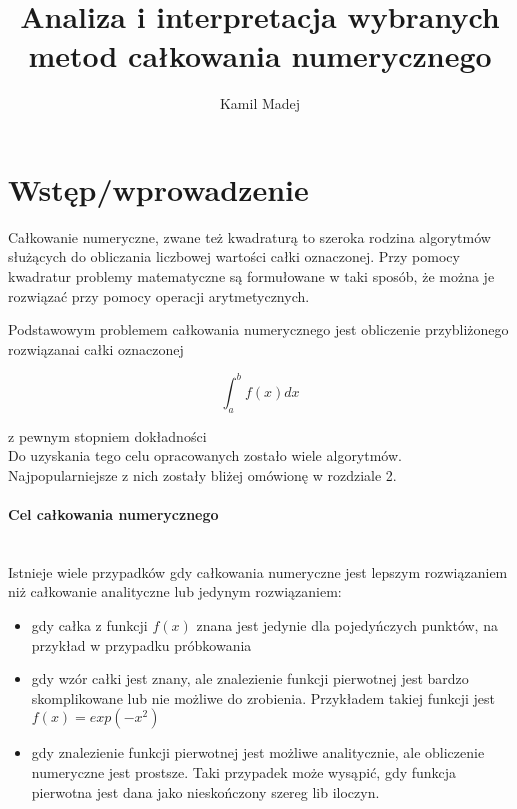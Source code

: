 \documentclass[12pt,twoside]{article}
\author{Kamil Madej}
\title{Analiza i interpretacja wybranych metod całkowania numerycznego}
\begin{document}
\maketitle

\blankpage

\tableofcontents

\clearpage
\blankpage


\section{Wstęp/wprowadzenie}

Całkowanie numeryczne, zwane też kwadraturą to szeroka rodzina algorytmów służących do obliczania liczbowej wartości całki oznaczonej.
Przy pomocy kwadratur problemy matematyczne są formułowane w taki sposób, że można je rozwiązać przy pomocy operacji arytmetycznych.

Podstawowym problemem całkowania numerycznego jest obliczenie przybliżonego rozwiązanai całki oznaczonej

\begin{equation}
\int_a^b f(x) dx
\end{equation}

z pewnym stopniem dokładności\\
Do uzyskania tego celu opracowanych zostało wiele algorytmów. Najpopularniejsze z nich zostały bliżej omówionę w rozdziale 2.

\paragraph{Cel całkowania numerycznego}\mbox{} \\

Istnieje wiele przypadków gdy całkowania numeryczne jest lepszym rozwiązaniem niż całkowanie analityczne lub jedynym rozwiązaniem:
\begin{itemize}
	\item gdy całka z funkcji $f(x)$ znana jest jedynie dla pojedyńczych punktów, na przykład w przypadku próbkowania
	\item gdy wzór całki jest znany, ale znalezienie funkcji pierwotnej jest bardzo skomplikowane lub nie możliwe do zrobienia. Przykładem takiej funkcji jest $f(x) = exp(-x^2)$
	\item gdy znalezienie funkcji pierwotnej jest możliwe analitycznie, ale obliczenie numeryczne jest prostsze. Taki przypadek może wysąpić, gdy funkcja pierwotna jest dana jako nieskończony szereg lib iloczyn.
\end{itemize}
\cite{Intro1}
\end{document}
